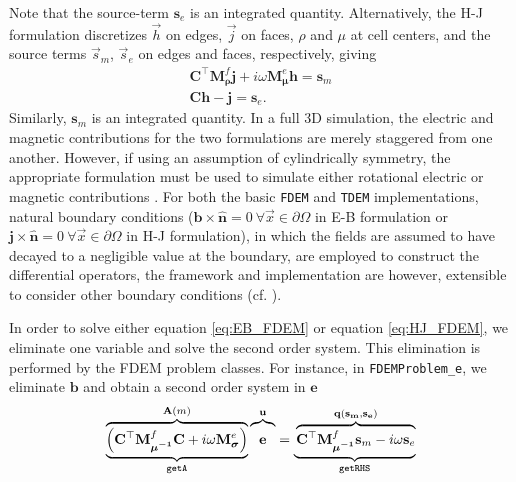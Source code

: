 \documentclass[preprint,review,3p,times,onecolumn,authoryear]{elsarticle}
\newcommand{\TDEM}{\texttt{TDEM}\xspace}
\newcommand{\FDEM}{\texttt{FDEM}\xspace}
\newcommand{\sm}{\mathbf{s}_m}
\newcommand{\se}{\mathbf{s}_e}
\newcommand{\dcurl}{{\mathbf C}}
\newcommand{\M}{{\mathbf M}}
\newcommand{\MfMui}{{\M^f_{\boldsymbol{\mu^{-1}}}}}
\newcommand{\MfRho}{{\M^f_{\boldsymbol{\rho}}}}
\newcommand{\MeSigma}{{\M^e_{\boldsymbol{\sigma}}}}
\newcommand{\MeMu}{{\M^e_{\boldsymbol{\mu}}}}
\begin{document}
Note that
the source-term $\se$ is an integrated quantity. Alternatively, the H-J
formulation discretizes $\vec{h}$ on edges, $\vec{j}$ on faces, $\rho$ and
$\mu$ at cell centers, and the source terms $\vec{s}_m$, $\vec{s}_e$ on edges
and faces, respectively, giving
\begin{equation}
    \begin{split}
        \dcurl^\top \MfRho \mathbf{j} + i\omega\MeMu\mathbf{h} = \sm \\
        \dcurl \mathbf{h} - \mathbf{j} = \se.
    \end{split}
    \label{eq:HJ_FDEM}
\end{equation}
Similarly, $\sm$ is an integrated quantity. In a full 3D simulation, the
electric and magnetic contributions for the two formulations are merely
staggered from one another. However, if using an assumption of cylindrically
symmetry, the appropriate formulation must be used to simulate either
rotational electric or magnetic contributions \citep{Heagy2015}. For both the
basic \FDEM and \TDEM implementations, natural boundary conditions ($\mathbf{b}
\times \hat{\mathbf{n}} = 0 ~ \forall \vec{x} \in \partial \Omega$ in E-B
formulation or $\mathbf{j} \times \hat{\mathbf{n}} = 0 ~ \forall \vec{x}
\in \partial \Omega$ in H-J formulation), in which the fields are assumed to
have decayed to a negligible value at the boundary, are employed to construct
the differential operators, the framework and implementation are however,
extensible to consider other boundary conditions (cf. \cite{Haber2014a,
Rivera-rios2014}).

In order to solve either equation \ref{eq:EB_FDEM} or equation \ref{eq:HJ_FDEM}, we eliminate
one variable and solve the second order system. This elimination is performed
by the FDEM problem classes. For instance, in \FDEM \texttt{Problem\_e}, we
eliminate $\mathbf{b}$ and obtain a second order system in $\mathbf{e}$
\begin{equation}
\underbrace{
\overbrace{
\left(\dcurl^\top \MfMui \dcurl + i\omega\MeSigma\right)
}^{\mathbf{A}(m)}}_{\texttt{getA}}
\overbrace{\vphantom{\left(\MfMui\right)}
            \mathbf{e}}^{\mathbf{u}}
=
\underbrace{ \vphantom{\left(\MfMui\right)}
\overbrace{
\dcurl^\top \MfMui \sm - i \omega \se
}^{\mathbf{q(s_m, s_e)}}
}_{\texttt{getRHS}}
\label{eq:problem_e}
\end{equation}
\end{document}
